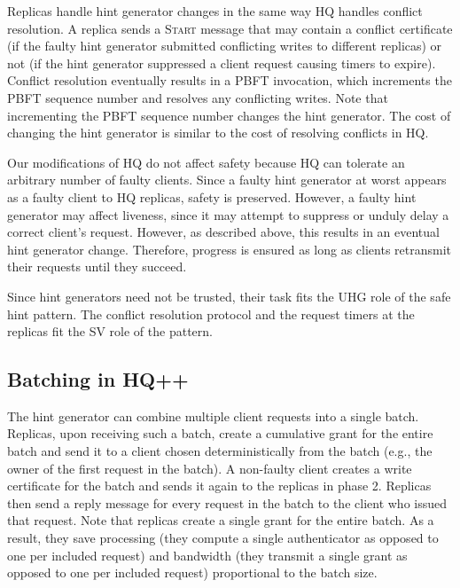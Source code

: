 \documentclass[twocolumn,10pt]{article}
\begin{document}
 Replicas handle hint generator changes in
the same way HQ handles conflict resolution. A replica sends a
\textsc{Start} message that may contain a conflict certificate (if the
faulty hint generator submitted conflicting writes to different
replicas) or not (if the hint generator suppressed a client request
causing timers to expire).  Conflict resolution eventually results in
a PBFT invocation, which increments the PBFT sequence number and
resolves any conflicting writes.  Note that incrementing the PBFT
sequence number changes the hint generator. The cost of
changing the hint generator is similar to the cost of resolving
conflicts in HQ.

 Our modifications of HQ do not affect safety
because HQ can tolerate an arbitrary number of faulty clients. Since a
faulty hint generator at worst appears as a faulty client to HQ
replicas, safety is
preserved.  However, a faulty hint generator may affect liveness,
since it may attempt to suppress or unduly delay a correct client's
request. However, as described above, this results in an eventual hint
generator change. Therefore, progress is ensured as long as clients
retransmit their requests until they succeed.

Since hint generators need not be trusted, their task fits the UHG
role of the safe hint pattern. The conflict resolution protocol and
the request timers at the replicas fit the SV role of the pattern.

\subsection{Batching in HQ++}

The hint generator can combine multiple client
requests into a single batch. Replicas, upon receiving such a batch,
create a cumulative grant for the entire batch and send it to a client
chosen deterministically from the batch (e.g., the owner of the first
request in the batch).  A non-faulty client creates a write certificate
for the batch and sends it again to the replicas in phase 2.  Replicas
then send a reply message for every request in the batch to the client
who issued that request.  Note that replicas create a single grant for
the entire batch. As a result, they save processing (they
compute a single
authenticator as opposed to one per included request) and bandwidth
(they transmit a single grant as opposed to one per included request)
proportional to the batch size.
\end{document}
